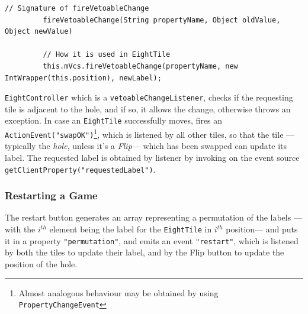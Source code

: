    {
      \begin{lstlisting}[label=lst:fireVetoableChange,captionpos=b,caption={How \lstinline|fireVetoableChange| is used in \lstinline|EightTile|}]
         // Signature of fireVetoableChange
         fireVetoableChange(String propertyName, Object oldValue, Object newValue)

         // How it is used in EightTile
         this.mVcs.fireVetoableChange(propertyName, new IntWrapper(this.position), newLabel);
      \end{lstlisting}
   }

\lstinline|EightController| which is a \lstinline|vetoableChangeListener|, checks if the requesting tile is adjacent to the hole, and if so, it allows the change, otherwise throws an exception.
In case an \lstinline|EightTile| successfully moves, fires an \lstinline|ActionEvent("swapOK")|\footnote{Almost analogous behaviour may be obtained by using \lstinline|PropertyChangeEvent|}, which is listened by all other tiles, so that the tile ---typically the \textit{hole}, unless it's a \textit{Flip}--- which has been swapped can update its label.
The requested label is obtained by listener by invoking on the event source \lstinline|getClientProperty("requestedLabel")|.

\subsubsection{Restarting a Game}
The restart button generates an array representing a permutation of the labels ---with the $i^{th}$ element being the label for the \lstinline|EightTile| in $i^{th}$ position--- and puts it in a property \lstinline|"permutation"|, and emits an event \lstinline|"restart"|, which is listened by both the tiles to update their label, and by the Flip button to update the position of the hole.

